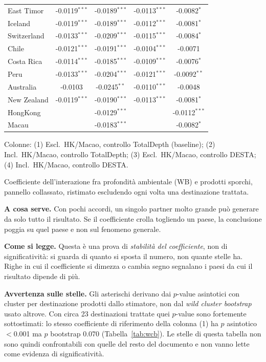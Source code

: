 \begin{table}[htbp]
\begin{threeparttable}
\begin{tabular}{lcccc}
East Timor & -0.0119$^{***}$ & -0.0189$^{***}$ & -0.0113$^{***}$ & -0.0082$^{*}$ \\
Iceland & -0.0119$^{***}$ & -0.0189$^{***}$ & -0.0112$^{***}$ & -0.0081$^{*}$ \\
Switzerland & -0.0133$^{***}$ & -0.0209$^{***}$ & -0.0115$^{***}$ & -0.0084$^{*}$ \\
Chile & -0.0121$^{***}$ & -0.0191$^{***}$ & -0.0104$^{***}$ & -0.0071 \\
Costa Rica & -0.0114$^{***}$ & -0.0185$^{***}$ & -0.0109$^{***}$ & -0.0076$^{*}$ \\
Peru & -0.0133$^{***}$ & -0.0204$^{***}$ & -0.0121$^{***}$ & -0.0092$^{**}$ \\
Australia & -0.0103 & -0.0245$^{**}$ & -0.0110$^{***}$ & -0.0048 \\
New Zealand & -0.0119$^{***}$ & -0.0190$^{***}$ & -0.0113$^{***}$ & -0.0081$^{*}$ \\
HongKong &  & -0.0129$^{***}$ &  & -0.0112$^{***}$ \\
Macau &  & -0.0183$^{***}$ &  & -0.0082$^{*}$ \\
\bottomrule
\end{tabular}
\begin{tablenotes}[flushleft]\footnotesize
\item Colonne: (1) Escl.\ HK/Macao, controllo TotalDepth (baseline); (2) Incl.\ HK/Macao, controllo TotalDepth; (3) Escl.\ HK/Macao, controllo DESTA; (4) Incl.\ HK/Macao, controllo DESTA.
\item Coefficiente dell'interazione fra profondit\`a ambientale (WB) e prodotti sporchi, pannello collassato, ristimato escludendo ogni volta una destinazione trattata.
\item \textbf{A cosa serve.} Con pochi accordi, un singolo partner molto grande pu\`o generare da solo tutto il risultato. Se il coefficiente crolla togliendo un paese, la conclusione poggia su quel paese e non sul fenomeno generale.
\item \textbf{Come si legge.} Questa \`e una prova di \emph{stabilit\`a del coefficiente}, non di significativit\`a: si guarda di quanto si sposta il numero, non quante stelle ha. Righe in cui il coefficiente si dimezza o cambia segno segnalano i paesi da cui il risultato dipende di pi\`u.
\item \textbf{Avvertenza sulle stelle.} Gli asterischi derivano dai $p$-value asintotici con cluster per destinazione prodotti dallo stimatore, non dal \emph{wild cluster bootstrap} usato altrove. Con circa 23 destinazioni trattate quei $p$-value sono fortemente sottostimati: lo stesso coefficiente di riferimento della colonna (1) ha $p$ asintotico $<$0.001 ma $p$ bootstrap 0.070 (Tabella~\ref{tab:wcb}). Le stelle di questa tabella non sono quindi confrontabili con quelle del resto del documento e non vanno lette come evidenza di significativit\`a.

\end{tablenotes}
\end{threeparttable}
\end{table}
